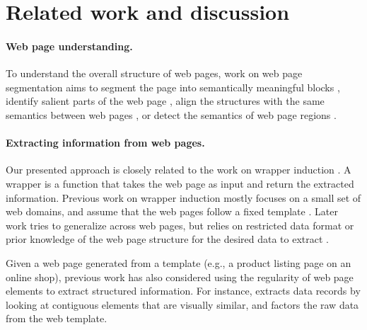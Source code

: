 \section{Related work and discussion}
\label{sec:webpage-discussion}

\paragraph{Web page understanding.}
To understand the overall structure of web pages,
work on web page segmentation aims to segment the page
into semantically meaningful blocks
\cite{bing2014web,kreuzer2015quantitative},
identify salient parts of the web page
\cite{gamon2013identifying,shen2014webpage},
align the structures with the same semantics between web pages
\cite{kumar2011bricolage},
or detect the semantics of web page regions
\cite{spengler2010document,kumar2013webzeitgeist}.

\paragraph{Extracting information from web pages.}
Our presented approach is closely related to the work on
wrapper induction \cite{kushmerick1997wrapper}.
A wrapper is a function that takes the web page as input
and return the extracted information.
Previous work on wrapper induction
mostly focuses on a small set of web domains,
and assume that the web pages follow a fixed template
\cite{muslea2001hierarchical,crescenzi2001roadrunner,cohen2002flexible,arasu2003extracting,dalvi2011automatic}.
Later work tries to generalize across web pages,
but relies on restricted data format \cite{wong2009scalable}
or prior knowledge of the web page structure
for the desired data to extract \cite{zhang2013automatic}.

Given a web page generated from a template
(e.g., a product listing page on an online shop),
previous work has also considered using
the regularity of web page elements
to extract structured information.
For instance, \citet{grigalis2014unsupervised}
extracts data records by looking at contiguous elements
that are visually similar,
and \citet{omari2016lossless}
factors the raw data from the web template.

